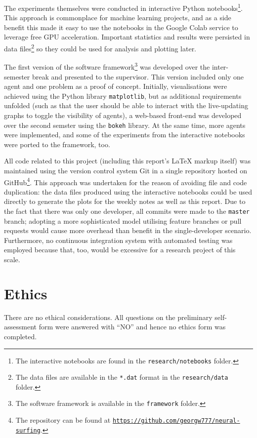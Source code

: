 The experiments themselves were conducted in interactive Python notebooks\footnote{The interactive notebooks are found in the \texttt{research/notebooks} folder.}.
This approach is commonplace for machine learning projects, and as a side benefit this made it easy to use the notebooks in the Google Colab service to leverage free GPU acceleration.
Important statistics and results were persisted in data files\footnote{The data files are available in the \texttt{*.dat} format in the \texttt{research/data} folder.} so they could be used for analysis and plotting later.

The first version of the software framework\footnote{The software framework is available in the \texttt{framework} folder.} was developed over the inter-semester break and presented to the supervisor.
This version included only one agent and one problem as a proof of concept. 
Initially, visualisations were achieved using the Python library \texttt{matplotlib}, but as additional requirements unfolded (such as that the user should be able to interact with the live-updating graphs to toggle the visibility of agents), a web-based front-end was developed over the second semster using the \texttt{bokeh} library.
At the same time, more agents were implemented, and some of the experiments from the interactive notebooks were ported to the framework, too.

All code related to this project (including this report's \LaTeX{} markup itself) was maintained using the version control system Git in a single repository hosted on GitHub\footnote{The repository can be found at \href{https://github.com/georgw777/neural-surfing}{\texttt{https://github.com/georgw777/neural-surfing}}.}.
This approach was undertaken for the reason of avoiding file and code duplication: the data files produced using the interactive notebooks could be used directly to generate the plots for the weekly notes as well as this report.
Due to the fact that there was only one developer, all commits were made to the \texttt{master} branch; adopting a more sophisticated model utilising feature branches or pull requests would cause more overhead than benefit in the single-developer scenario.
Furthermore, no continuous integration system with automated testing was employed because that, too, would be excessive for a research project of this scale. 

\section{Ethics}
There are no ethical considerations. 
All questions on the preliminary self-assessment form were answered with ``NO'' and hence no ethics form was completed.


